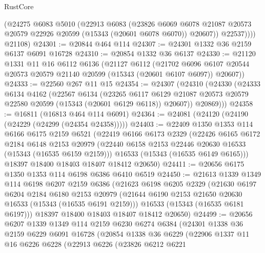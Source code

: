 \begin{lexlean}{RustCore}
\begin{coremodule}
            (@24275
              @6083
              @5010
              (@22913
                @6083
                (@23826
                  @6069
                  @6078
                  @21087
                  @20573
                  @20579
                  @22926
                  @20599
                  (@15343 (@20601 @6078 @6070))
                  @20607))
              @22537))))
      @21108)
@24301 := @20844 @464 @114
@24307 := @24301 @1332 @36 @2159 @6137 @6091 @16728
@24310 := @20854 @1332 @36 @6137
@24330 := @21120
    @1331
    @11
    @16
    @6112
    @6136
    (@21127
      @6112
      (@21702 @6096 @6107 @20544 @20573 @20579 @21140 @20599 (@15343 (@20601 @6107 @6097)) @20607))
@24333 := @22560 @267 @11 @15
@24354 := @24307
    (@24310
      (@24330
        (@24333
          @6134
          @4162
          (@22567
            @6134
            (@23265
              @6117
              @6129
              @21087
              @20573
              @20579
              @22580
              @20599
              (@15343 (@20601 @6129 @6118))
              @20607))
          @20869)))
@24358 := @16811 (@16813 @464 @114 @6091)
@24364 := @24081 (@24120 (@24190 (@24229 (@24299 (@24354 @24358)))))
@24403 := @22409
    @1350
    @1353
    @114
    @6166
    @6175
    @2159
    @6521
    (@22419
      @6166
      @6173
      @2329
      (@22426
        @6165
        @6172
        @2184
        @6148
        @2153
        @20979
        (@22440 @6158 @2153 @22446 @20630 @16533 (@15343 (@16535 @6159 @2159)))
        @16533
        (@15343 (@16535 @6149 @6165)))
      @18397
      @18400
      @18403
      @18407
      @18412
      @20650)
@24411 := @20656 @6175 @1350 @1353 @114 @6198 @6386 @6410 @6519
@24450 := @21613
    @1339
    @1349
    @114
    @6198
    @6207
    @2159
    @6386
    (@21623
      @6198
      @6205
      @2329
      (@21630
        @6197
        @6204
        @2184
        @6180
        @2153
        @20979
        (@21644 @6190 @2153 @21650 @20630 @16533 (@15343 (@16535 @6191 @2159)))
        @16533
        (@15343 (@16535 @6181 @6197)))
      @18397
      @18400
      @18403
      @18407
      @18412
      @20650)
@24499 := @20656
    @6207
    @1339
    @1349
    @114
    @2159
    @6230
    @6274
    @6384
    (@24301
      @1338
      @36
      @2159
      @6229
      @6091
      @16728
      (@20854
        @1338
        @36
        @6229
        (@22906
          @1337
          @11
          @16
          @6226
          @6228
          (@22913
            @6226
            (@23826
              @6212
              @6221

\end{coremodule}
\end{lexlean}
